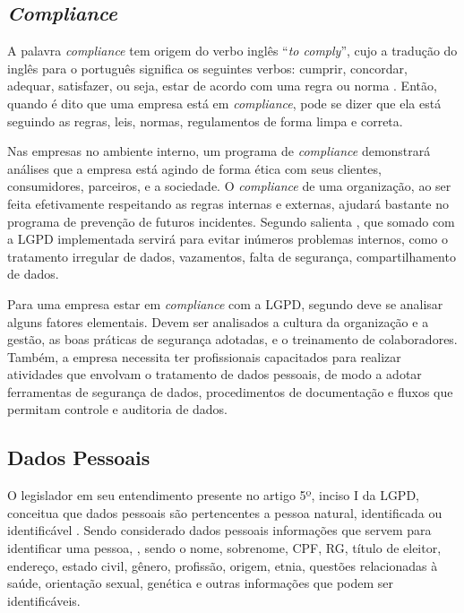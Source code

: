 \documentclass[
	12pt,				%
	openright,			%
	oneside,			%
	a4paper,			%
	english,			%
	french,				%
	spanish,			%
	brazil,				%
	]{abntex2}
\begin{document}
\subsection{\textit{Compliance}}

A palavra \textit{compliance} tem origem do verbo inglês “\textit{to comply}”, cujo a tradução do inglês para o português significa os seguintes verbos: cumprir, concordar, adequar, satisfazer, ou seja, estar de acordo com uma regra ou norma \cite{Lamboy2018}. Então, quando é dito que uma empresa está em \textit{compliance}, pode se dizer que ela está seguindo as regras, leis, normas, regulamentos de forma limpa e correta.

Nas empresas no ambiente interno, um programa de \textit{compliance} demonstrará análises que a empresa está agindo de forma ética com seus clientes, consumidores, parceiros, e a sociedade. O \textit{compliance} de uma organização, ao ser feita efetivamente respeitando as regras internas e externas, ajudará bastante no programa de prevenção de futuros incidentes. Segundo salienta , que somado com a LGPD implementada servirá para evitar inúmeros problemas internos, como o tratamento irregular de dados, vazamentos, falta de segurança, compartilhamento de dados.

Para uma empresa estar em \textit{compliance} com a LGPD, segundo  deve se analisar alguns fatores elementais. Devem ser analisados a cultura da organização e a gestão, as boas práticas de segurança adotadas, e o treinamento de colaboradores. Também, a empresa necessita ter profissionais capacitados para realizar atividades que envolvam o tratamento de dados pessoais, de modo a adotar ferramentas de segurança de dados, procedimentos de documentação e fluxos que permitam controle e auditoria de dados. 

\subsection{Dados Pessoais}


O legislador em seu entendimento presente no artigo 5º, inciso I da LGPD, conceitua que dados pessoais são pertencentes a pessoa natural, identificada ou identificável \cite{01-01-LeiGeral}.  Sendo considerado dados pessoais informações que servem para identificar uma pessoa, \cite{Hoeren2020}, sendo o nome, sobrenome, CPF, RG, título de eleitor, endereço, estado civil, gênero, profissão, origem, etnia, questões relacionadas à saúde, orientação sexual, genética e outras informações que podem ser identificáveis.
\end{document}
